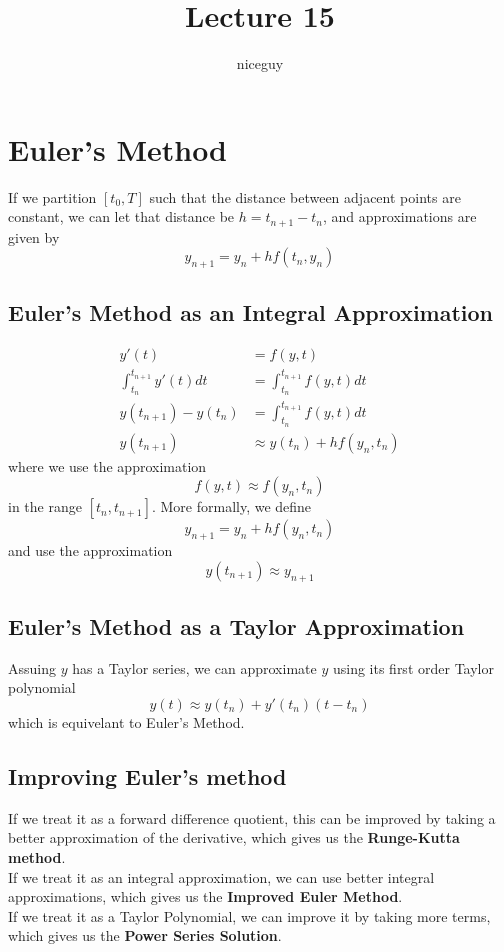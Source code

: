 \documentclass[12pt]{article}
\title{Lecture 15}
\author{niceguy}
\begin{document}
\maketitle

\section{Euler's Method}
If we partition $[t_0,T]$ such that the distance between adjacent points are constant, we can let that distance be $h = t_{n+1} - t_n$, and approximations are given by
$$y_{n+1} = y_n + hf(t_n,y_n)$$

\subsection{Euler's Method as an Integral Approximation}
\begin{align*}
	y'(t) &= f(y,t) \\
	\int_{t_n}^{t_{n+1}} y'(t) dt &= \int_{t_n}^{t_{n+1}} f(y,t) dt \\
	y(t_{n+1}) - y(t_n) &= \int_{t_n}^{t_{n+1}} f(y,t) dt \\
	y(t_{n+1}) &\approx y(t_n) + hf(y_n,t_n)
\end{align*}
where we use the approximation
$$f(y,t) \approx f(y_n,t_n)$$
in the range $[t_n,t_{n+1}]$. More formally, we define
$$y_{n+1} = y_n + hf(y_n,t_n)$$
and use the approximation
$$y(t_{n+1}) \approx y_{n+1}$$

\subsection{Euler's Method as a Taylor Approximation}
Assuing $y$ has a Taylor series, we can approximate $y$ using its first order Taylor polynomial
$$y(t) \approx y(t_n) + y'(t_n)(t-t_n)$$
which is equivelant to Euler's Method.

\subsection{Improving Euler's method}
If we treat it as a forward difference quotient, this can be improved by taking a better approximation of the derivative, which gives us the \textbf{Runge-Kutta method}. \\
If we treat it as an integral approximation, we can use better integral approximations, which gives us the \textbf{Improved Euler Method}. \\
If we treat it as a Taylor Polynomial, we can improve it by taking more terms, which gives us the \textbf{Power Series Solution}.
\end{document}
